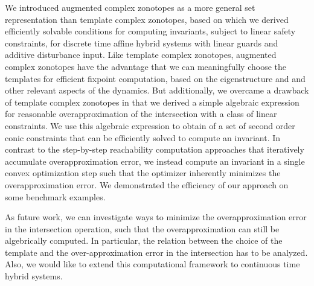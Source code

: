 We introduced augmented complex zonotopes as a more general set
representation than template complex zonotopes, based on which we
derived efficiently solvable conditions for computing invariants,
subject to linear safety constraints, for discrete time affine hybrid
systems with linear guards and additive disturbance input.  Like
template complex zonotopes, augmented complex zonotopes have the
advantage that we can meaningfully choose the templates for efficient
fixpoint computation, based on the eigenstructure and and other
relevant aspects of the dynamics.  But additionally, we overcame a
drawback of template complex zonotopes in that we derived a simple
algebraic expression for reasonable overapproximation of the
intersection with a class of linear constraints.  We use this
algebraic expression to obtain of a set of second order conic
constraints that can be efficiently solved to compute an invariant.
In contrast to the step-by-step reachability computation approaches
that iteratively accumulate overapproximation error, we instead
compute an invariant in a single convex optimization step such that
the optimizer inherently minimizes the overapproximation error.  We
demonstrated the efficiency of our approach on some benchmark
examples.

As future work, we can investigate ways to minimize the
overapproximation error in the intersection operation, such that the
overapproximation can still be algebrically computed.  In particular,
the relation between the choice of the template and the
over-approximation error in the intersection has to be analyzed.  Also, we
would like to extend this computational framework to continuous
time hybrid systems.
